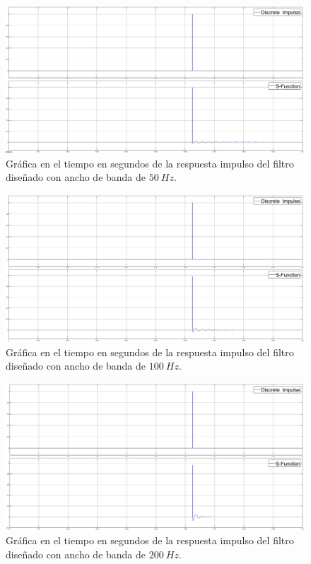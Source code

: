 \begin{enumerate}
\begin{figure}[H]
    \centering
    \includegraphics[scale = 0.2]{Figuras/p6_1-Impulse_50.jpg}
    \caption{Gráfica en el tiempo en segundos  de la respuesta impulso del filtro diseñado con ancho de banda de $50~Hz$.}
    \label{impbw50}
\end{figure}


\begin{figure}[H]
    \centering
    \includegraphics[scale = 0.2]{Figuras/p6_1-Impulse_100.jpg}
    \caption{Gráfica en el tiempo en segundos de la respuesta impulso del filtro diseñado con ancho de banda de $100~Hz$.}
    \label{impbw100}
\end{figure}

\begin{figure}[H]
    \centering
    \includegraphics[scale = 0.2]{Figuras/p6_1-Impulse_200.jpg}
    \caption{Gráfica en el tiempo en segundos de la respuesta impulso del filtro diseñado con ancho de banda de $200~Hz$.}
    \label{impbw200}
\end{figure}



\end{enumerate}
